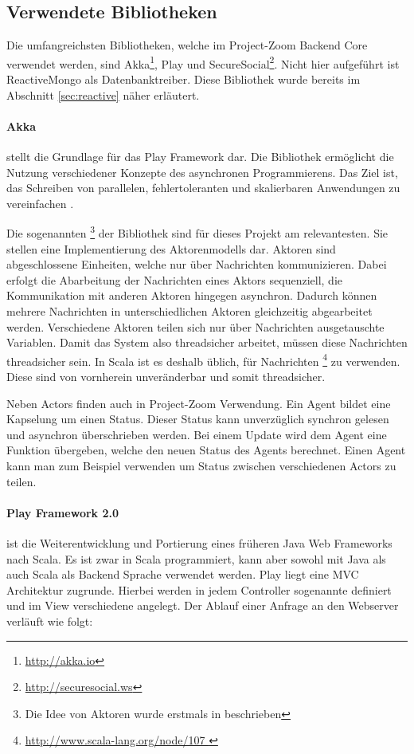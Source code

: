 \subsection{Verwendete Bibliotheken}
Die umfangreichsten Bibliotheken, welche im Project-Zoom Backend Core verwendet werden, sind Akka\footnote{\url{http://akka.io}}, Play und SecureSocial\footnote{\url{http://securesocial.ws}}. Nicht hier aufgeführt ist ReactiveMongo als Datenbanktreiber. Diese Bibliothek wurde bereits im Abschnitt \ref{sec:reactive} näher erläutert. 

\paragraph{Akka}\label{sec:actor} stellt die Grundlage für das Play Framework dar. Die Bibliothek ermöglicht die Nutzung verschiedener Konzepte des asynchronen Programmierens. Das Ziel ist, das Schreiben von parallelen, fehlertoleranten und skalierbaren Anwendungen zu vereinfachen \cite{what-is-akka}. 

Die sogenannten \footnote{Die Idee von Aktoren wurde erstmals in \cite{actors} beschrieben} der Bibliothek sind für dieses Projekt am relevantesten. Sie stellen eine Implementierung des Aktorenmodells dar. Aktoren sind abgeschlossene Einheiten, welche nur über Nachrichten kommunizieren. Dabei erfolgt die Abarbeitung der Nachrichten eines Aktors sequenziell, die Kommunikation mit anderen Aktoren hingegen asynchron. Dadurch können mehrere Nachrichten in unterschiedlichen Aktoren gleichzeitig abgearbeitet werden. Verschiedene Aktoren teilen sich nur über Nachrichten ausgetauschte Variablen. Damit das System also threadsicher arbeitet, müssen diese Nachrichten threadsicher sein. In Scala ist es deshalb üblich, für Nachrichten \footnote{\url{ http://www.scala-lang.org/node/107 }} zu verwenden. Diese sind von vornherein unveränderbar und somit threadsicher.

Neben Actors finden auch  in Project-Zoom Verwendung. Ein Agent bildet eine Kapselung um einen Status. Dieser Status kann unverzüglich synchron gelesen und asynchron überschrieben werden. Bei einem Update wird dem Agent eine Funktion übergeben, welche den neuen Status des Agents berechnet. Einen Agent kann man zum Beispiel verwenden um Status zwischen verschiedenen Actors zu teilen.

\paragraph{Play Framework 2.0} ist die Weiterentwicklung  und Portierung eines früheren Java Web Frameworks nach Scala. Es ist zwar in Scala programmiert, kann aber sowohl mit Java als auch Scala als Backend Sprache verwendet werden. Play liegt eine MVC Architektur zugrunde. Hierbei werden in jedem Controller sogenannte  definiert und im View verschiedene  angelegt. Der Ablauf einer Anfrage an den Webserver verläuft wie folgt:

